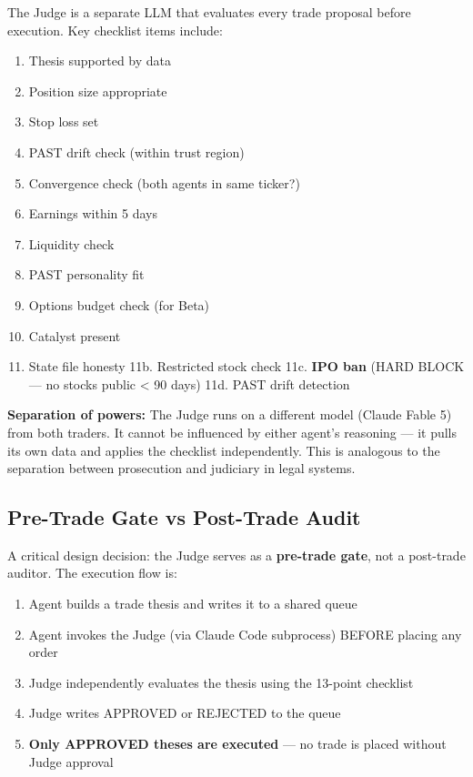 \documentclass[11pt]{article}
\providecommand{\tightlist}{\setlength{\itemsep}{0pt}\setlength{\parskip}{0pt}}
\begin{document}
The Judge is a separate LLM that evaluates every trade proposal before execution. Key checklist items include:

\begin{enumerate}
\def\labelenumi{\arabic{enumi}.}
\tightlist
\item
  Thesis supported by data
\item
  Position size appropriate
\item
  Stop loss set
\item
  PAST drift check (within trust region)
\item
  Convergence check (both agents in same ticker?)
\item
  Earnings within 5 days
\item
  Liquidity check
\item
  PAST personality fit
\item
  Options budget check (for Beta)
\item
  Catalyst present
\item
  State file honesty 11b. Restricted stock check 11c. \textbf{IPO ban} (HARD BLOCK --- no stocks public \textless{} 90 days) 11d. PAST drift detection
\end{enumerate}

\textbf{Separation of powers:} The Judge runs on a different model (Claude Fable 5) from both traders. It cannot be influenced by either agent's reasoning --- it pulls its own data and applies the checklist independently. This is analogous to the separation between prosecution and judiciary in legal systems.

\subsection{Pre-Trade Gate vs Post-Trade Audit}\label{pre-trade-gate-vs-post-trade-audit}

A critical design decision: the Judge serves as a \textbf{pre-trade gate}, not a post-trade auditor. The execution flow is:

\begin{enumerate}
\def\labelenumi{\arabic{enumi}.}
\tightlist
\item
  Agent builds a trade thesis and writes it to a shared queue
\item
  Agent invokes the Judge (via Claude Code subprocess) BEFORE placing any order
\item
  Judge independently evaluates the thesis using the 13-point checklist
\item
  Judge writes APPROVED or REJECTED to the queue
\item
  \textbf{Only APPROVED theses are executed} --- no trade is placed without Judge approval
\end{enumerate}
\end{document}
